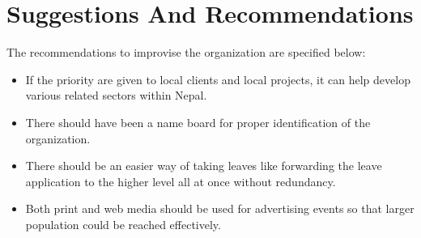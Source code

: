 \section{Suggestions And Recommendations}
The recommendations to improvise the organization are specified below:
\begin{itemize}
\item If the priority are given to local clients and local projects, it can help develop various related sectors
within Nepal.
\item  There should have been a name board for proper identification of the organization.
\item  There should be an easier way of taking leaves like forwarding the leave application to the higher level
all at once without redundancy.
\item
Both print and web media should be used for advertising events so that larger population could be
reached effectively.
\end{itemize}
\cleardoublepage
